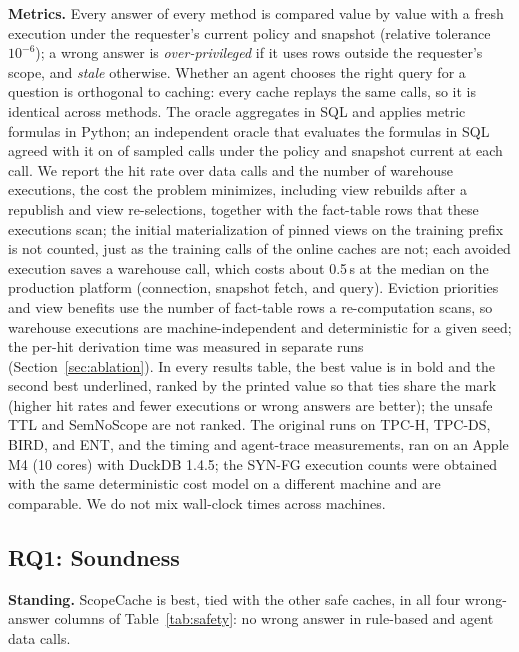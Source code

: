 \documentclass[sigconf, nonacm]{acmart}
\newcommand{\M}[1]{\textsf{#1}}
\begin{document}
\textbf{Metrics.} Every answer of every method is compared value by value with a fresh execution under the requester's current policy and snapshot (relative tolerance $10^{-6}$); a wrong answer is \emph{over-privileged} if it uses rows outside the requester's scope, and \emph{stale} otherwise. Whether an agent chooses the right query for a question is orthogonal to caching: every cache replays the same calls, so it is identical across methods. The oracle aggregates in SQL and applies metric formulas in Python; an independent oracle that evaluates the formulas in SQL agreed with it on \oracleAgree{} of \oracleChecked{} sampled calls under the policy and snapshot current at each call. We report the hit rate over data calls and the number of warehouse executions, the cost the problem minimizes, including view rebuilds after a republish and view re-selections, together with the fact-table rows that these executions scan; the initial materialization of pinned views on the training prefix is not counted, just as the training calls of the online caches are not; each avoided execution saves a warehouse call, which costs about 0.5\,s at the median on the production platform (connection, snapshot fetch, and query). Eviction priorities and view benefits use the number of fact-table rows a re-computation scans, so warehouse executions are machine-independent and deterministic for a given seed; the per-hit derivation time was measured in separate runs (Section~\ref{sec:ablation}). In every results table, the best value is in bold and the second best underlined, ranked by the printed value so that ties share the mark (higher hit rates and fewer executions or wrong answers are better); the unsafe \M{TTL} and \M{SemNoScope} are not ranked. The original runs on TPC-H, TPC-DS, BIRD, and ENT, and the timing and agent-trace measurements, ran on an Apple M4 (10 cores) with DuckDB 1.4.5; the SYN-FG execution counts were obtained with the same deterministic cost model on a different machine and are comparable. We do not mix wall-clock times across machines.

\subsection{RQ1: Soundness}
\label{sec:rq1}

\textbf{Standing.} ScopeCache is best, tied with the other safe caches, in all four wrong-answer columns of Table~\ref{tab:safety}: no wrong answer in \nMainDataCalls{} rule-based and \nAgentDataCalls{} agent data calls.
\end{document}
